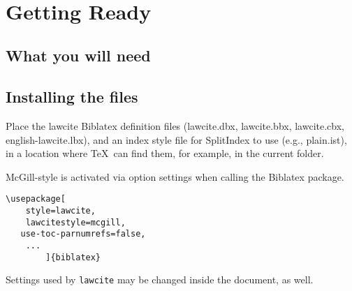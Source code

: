 \usepackage[
				final=true,
				bookmarks,
            colorlinks=true,        
            allcolors = black,  
            citecolor=blue, 
            hyperindex=false,       
]{hyperref}




\maketitle
\begin{abstract}
\myabstracttext
\end{abstract}
\newpage
\tableofcontents
\bigskip
\hfill{}\hfill\ %
\bigskip
\hfill{}\hfill\ %
\bigskip
\section{Getting Ready}
\subsection{What you will need}
\subsection{Installing the files}
Place the lawcite Biblatex definition files (lawcite.dbx, lawcite.bbx, lawcite.cbx, english-lawcite.lbx), and an index style file for SplitIndex to use (e.g., plain.ist), in a location where \TeX\ can find them, for example, in the current folder.

McGill-style is activated via option settings when calling the Biblatex package.

\begin{verbatim}
\usepackage[
	style=lawcite, 
	lawcitestyle=mcgill,
   use-toc-parnumrefs=false,
	...
		]{biblatex}
\end{verbatim}

Settings used by \texttt{lawcite} may be changed inside the document, as well.

